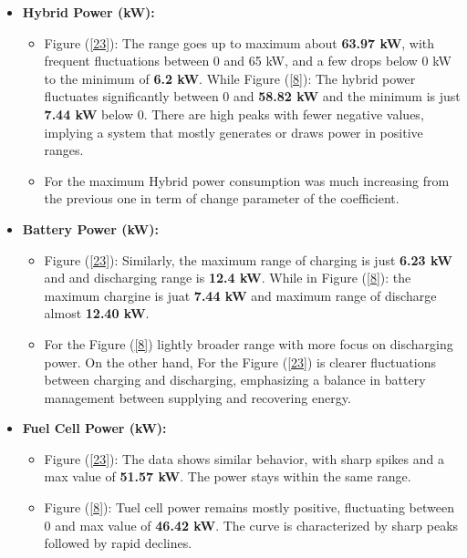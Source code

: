 \documentclass[12pt,a4paper]{article}
\numberwithin{equation}{section}
\begin{document}
\begin{itemize}
	\item \textbf{Hybrid Power (kW):}
	\begin{itemize}
		\item {Figure (\ref{23}):} The range goes up to maximum about \textbf{63.97 kW}, with frequent fluctuations between 0 and 65 kW, and a few drops below 0 kW to the minimum of \textbf{6.2 kW}. While {Figure (\ref{8}):} The hybrid power fluctuates significantly between 0 and \textbf{58.82 kW} and the minimum is just \textbf{7.44 kW} below 0. There are high peaks with fewer negative values, implying a system that mostly generates or draws power in positive ranges.
		\item For the maximum Hybrid power consumption was much increasing from the previous one in term of change parameter of the coefficient.
	\end{itemize}
	
	
	\item \textbf{Battery Power (kW):}
	\begin{itemize}
		\item {Figure (\ref{23}):} Similarly, the maximum range of charging is just \textbf{6.23 kW} and and discharging range is \textbf{12.4 kW}. While in {Figure (\ref{8}):} the maximum chargine is juat \textbf{7.44 kW} and maximum range of discharge almost \textbf{12.40 kW}. 
		\item For the Figure (\ref{8}) lightly broader range with more focus on discharging power.
		On the other hand, For the Figure (\ref{23}) is clearer fluctuations between charging and discharging, emphasizing a balance in battery management between supplying and recovering energy.
	\end{itemize}
	
		\item \textbf{Fuel Cell Power (kW):}
	\begin{itemize}
		\item {Figure (\ref{23}):} The data shows similar behavior, with sharp spikes and a max value of \textbf{51.57 kW}. The power stays within the same range.
		\item {Figure (\ref{8}):} Tuel cell power remains mostly positive, fluctuating between 0 and max value of \textbf{46.42 kW}. The curve is characterized by sharp peaks followed by rapid declines.
	\end{itemize}
	

\end{itemize}
\end{document}
